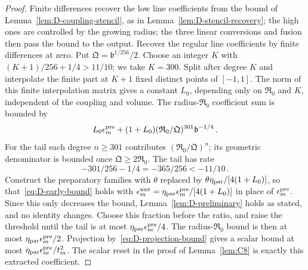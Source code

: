 \begin{proof}
Finite differences recover the low line coefficients from the bound of Lemma~\ref{lem:D-coupling-stencil}, as in Lemma~\ref{lem:D-stencil-recovery}; the high ones are controlled by the growing radius; the three linear conversions and fusion then pass the bound to the output. Recover the regular line coefficients by finite differences at zero. Put $\mathfrak Q=\mathfrak b^{1/256}/2$. Choose an integer $K$ with $(K+1)/256+1/4>11/10$; we take $K=300$. Split after degree $K$ and interpolate the finite part at $K+1$ fixed distinct points of $[-1,1]$. The norm of this finite interpolation matrix gives a constant $L_0$, depending only on $\mathfrak R_0$ and $K$, independent of the coupling and volume. The radius-$\mathfrak R_0$ coefficient sum is bounded by
\begin{equation*}
L_0 \epsilon^{\rm pre}_m+(1+L_0)(\mathfrak R_0/\mathfrak Q)^{301}\mathfrak b^{-1/4}\,.
\end{equation*}
For the tail each degree $n\ge301$ contributes $(\mathfrak R_0/\mathfrak Q)^n$; its geometric denominator is bounded once $\mathfrak Q\ge2\mathfrak R_0$. The tail has rate
\begin{equation*}
-301/256-1/4=-365/256<-11/10\,.
\end{equation*}
Construct the preparatory families with $\theta$ replaced by $\theta\eta_{\rm par}/[4(1+L_0)]$, so that~\eqref{eq:D-early-bound} holds with $\epsilon^{\rm aux}_m=\eta_{\rm par}\epsilon^{\rm pre}_m/[4(1+L_0)]$ in place of $\epsilon^{\rm pre}_m$. Since this only decreases the bound, Lemma~\ref{lem:D-preliminary} holds as stated, and no identity changes. Choose this fraction before the ratio, and raise the threshold until the tail is at most $\eta_{\rm par}\epsilon^{\rm pre}_m/4$. The radius-$\mathfrak R_0$ bound is then at most $\eta_{\rm par}\epsilon^{\rm pre}_m/2$. Projection by~\eqref{eq:D-projection-bound} gives a scalar bound at most $\eta_{\rm par}\epsilon^{\rm pre}_m/t_m^2$. The scalar reset in the proof of Lemma~\ref{lem:C8} is exactly this extracted coefficient.


\end{proof}
